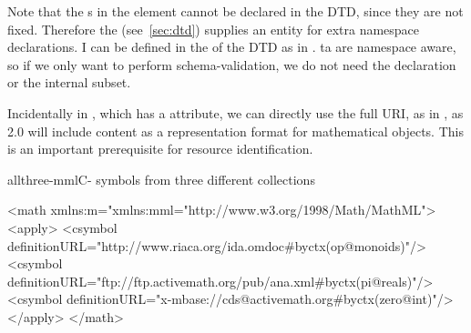 Note that the {s} in
the {\omdoc} element cannot be declared in the {\omdoc} DTD, since they are not
fixed. Therefore the {} (see~\ref{sec:dtd}) supplies an entity
{} for extra namespace declarations. I can be defined in the
{} of the DTD as in
{}. {ta} are namespace aware, so if
we only want to perform schema-validation, we do not need the {}
declaration or the internal subset.

Incidentally in {\mathml}, which has a {}
attribute, we can directly use the full URI, as in {}, as
{\omdoc}2.0 will include content {\mathml} as a representation format for
mathematical objects. This is an important prerequisite for resource
identification.

\begin{myfig}{allthree-mml}{C-{\mathml} symbols from three different
    collections}\scriptsize
\begin{boxedverbatim}
 <math xmlns:m="xmlns:mml="http://www.w3.org/1998/Math/MathML">
  <apply>
   <csymbol definitionURL="http://www.riaca.org/ida.omdoc#byctx(op@monoids)"/>
   <csymbol definitionURL="ftp://ftp.activemath.org/pub/ana.xml#byctx(pi@reals)"/>
   <csymbol definitionURL="x-mbase://cds@activemath.org#byctx(zero@int)"/>
  </apply>
 </math>
\end{boxedverbatim}
\end{myfig}

